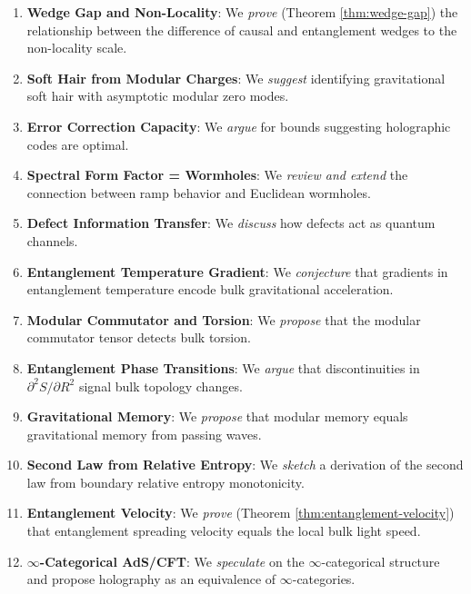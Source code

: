 \documentclass[12pt,a4paper]{article}
\begin{document}
\begin{enumerate}
    \item \textbf{Wedge Gap and Non-Locality}: We \textit{prove} (Theorem \ref{thm:wedge-gap}) the relationship between the difference of causal and entanglement wedges to the non-locality scale.
    
    \item \textbf{Soft Hair from Modular Charges}: We \textit{suggest} identifying gravitational soft hair with asymptotic modular zero modes.
    
    \item \textbf{Error Correction Capacity}: We \textit{argue} for bounds suggesting holographic codes are optimal.
    
    \item \textbf{Spectral Form Factor = Wormholes}: We \textit{review and extend} the connection between ramp behavior and Euclidean wormholes.
    
    \item \textbf{Defect Information Transfer}: We \textit{discuss} how defects act as quantum channels.
    
    \item \textbf{Entanglement Temperature Gradient}: We \textit{conjecture} that gradients in entanglement temperature encode bulk gravitational acceleration.
    
    \item \textbf{Modular Commutator and Torsion}: We \textit{propose} that the modular commutator tensor detects bulk torsion.
    
    \item \textbf{Entanglement Phase Transitions}: We \textit{argue} that discontinuities in $\partial^2 S/\partial R^2$ signal bulk topology changes.
    
    \item \textbf{Gravitational Memory}: We \textit{propose} that modular memory equals gravitational memory from passing waves.
    
    \item \textbf{Second Law from Relative Entropy}: We \textit{sketch} a derivation of the second law from boundary relative entropy monotonicity.
    
    \item \textbf{Entanglement Velocity}: We \textit{prove} (Theorem \ref{thm:entanglement-velocity}) that entanglement spreading velocity equals the local bulk light speed.
    
    \item \textbf{$\infty$-Categorical AdS/CFT}: We \textit{speculate} on the $\infty$-categorical structure and propose holography as an equivalence of $\infty$-categories.
    

\end{enumerate}
\end{document}
